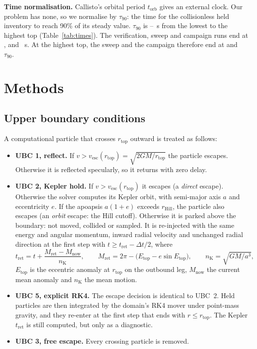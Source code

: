 \documentclass[10pt]{article}
\newcommand{\para}[1]{\textbf{#1}\hspace{0.5em}}
\newcommand{\torb}{t_\mathrm{orb}}
\newcommand{\tauf}{\tau_{90}}
\newcommand{\rtop}{r_\mathrm{top}}
\newcommand{\rhill}{r_\mathrm{Hill}}
\begin{document}
\para{Time normalisation.} Callisto's orbital period $\torb$ gives \citet{cm21} an external clock. Our problem has none, so we normalise by $\tauf$: the time for the collisionless held inventory to reach 90\% of its steady value. $\tauf$ is \tauFillLo{}–\tauFillHi{}~s from the lowest to the highest top (Table~\ref{tab:times}). The verification, sweep and campaign runs end at \verTend{}, \sweepTend{} and \campTend{}~s. At the highest top, the sweep and the campaign therefore end at \sweepTendOverTau{} and \campTendOverTau{}\,$\tauf$.

\section{Methods}\label{sec:methods}

\subsection{Upper boundary conditions}\label{sec:ubc}

A computational particle that crosses $\rtop$ outward is treated as follows:
\begin{itemize}
  \item \textbf{UBC 1, reflect.} If $v > v_\mathrm{esc}(\rtop) = \sqrt{2GM/\rtop}$ the particle escapes. Otherwise it is reflected specularly, so it returns with zero delay.
  \item \textbf{UBC 2, Kepler hold.} If $v > v_\mathrm{esc}(\rtop)$ it escapes (a \emph{direct} escape). Otherwise the solver computes its Kepler orbit, with semi-major axis $a$ and eccentricity $e$. If the apoapsis $a(1+e)$ exceeds $\rhill$, the particle also escapes (an \emph{orbit} escape: the Hill cutoff). Otherwise it is parked above the boundary: not moved, collided or sampled. It is re-injected with the same energy and angular momentum, inward radial velocity and unchanged radial direction at the first step with $t \ge t_\mathrm{ret} - \Delta t/2$, where
  \[
    t_\mathrm{ret} = t + \frac{M_\mathrm{ret} - M_\mathrm{now}}{n_\mathrm{K}},\qquad
    M_\mathrm{ret} = 2\pi - \bigl(E_\mathrm{top} - e\sin E_\mathrm{top}\bigr),\qquad n_\mathrm{K} = \sqrt{GM/a^3},
  \]
  $E_\mathrm{top}$ is the eccentric anomaly at $\rtop$ on the outbound leg, $M_\mathrm{now}$ the current mean anomaly and $n_\mathrm{K}$ the mean motion.
  \item \textbf{UBC 5, explicit RK4.} The escape decision is identical to UBC~2. Held particles are then integrated by the domain's RK4 mover under point-mass gravity, and they re-enter at the first step that ends with $r \le \rtop$. The Kepler $t_\mathrm{ret}$ is still computed, but only as a diagnostic.
  \item \textbf{UBC 3, free escape.} Every crossing particle is removed.
\end{itemize}
\end{document}

